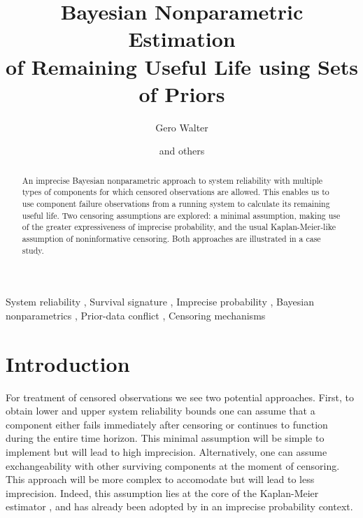 \documentclass[12pt, a4paper]{elsarticle}
\begin{document}
\begin{frontmatter}
\title{Bayesian Nonparametric Estimation\\ of Remaining Useful Life using Sets of Priors}

\author[ein]{Gero Walter}
\author{and others}

\address[ein]{School of Industrial Engineering, Eindhoven University of Technology, Eindhoven, NL}

\begin{abstract}
An imprecise Bayesian nonparametric approach
to system reliability with multiple types of components
for which censored observations are allowed.
This enables us to use component failure observations from a running system
to calculate its remaining useful life.
Two censoring assumptions are explored:
a minimal assumption, making use of the greater expressiveness of imprecise probability,
and the usual Kaplan-Meier-like assumption of noninformative censoring.
Both approaches are illustrated in a case study.
\end{abstract}

\begin{keyword}
System reliability \sep
Survival signature \sep
Imprecise probability \sep
Bayesian nonparametrics \sep
Prior-data conflict \sep
Censoring mechanisms
\end{keyword}
\end{frontmatter}



\section{Introduction}

For treatment of censored observations
we see two potential approaches.
First, to obtain lower and upper system reliability bounds 
one can assume that a component either fails immediately after censoring or
continues to function during the entire time horizon.
This minimal assumption will be simple to implement but will lead to high imprecision.
Alternatively, one can assume exchangeability with other surviving components at the moment of censoring.
This approach will be more complex to accomodate but will lead to less imprecision.
Indeed, this assumption lies at the core of the Kaplan-Meier estimator \citep{1958:kaplan-meier},
and has already been adopted by \citet{2004:coolen-yan} in an imprecise probability context.\\
\end{document}
